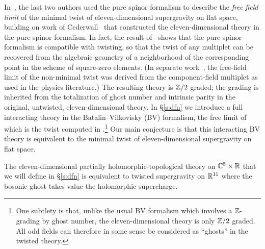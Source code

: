 In~\cite{SWspinor}, the last two authors used the pure spinor formalism to describe the {\em free field limit} of the minimal twist of eleven-dimensional supergravity on flat space, building on work of Cederwall~\cite{Ced-towards,Ced-11d} that constructed the eleven-dimensional theory in the pure spinor formalism. In fact, the result of~\cite{SWspinor} shows that the pure spinor formalism is compatible with twisting, so that the twist of any multiplet can be recovered from the algebraic geometry of a neighborhood of the corresponding point in the scheme of square-zero elements.
(In separate work~\cite{EagerHahner}, the free-field limit of the non-minimal twist was derived from the component-field multiplet as used in the physics literature.)
The resulting theory is $\mathbb Z/2$ graded; the grading is inherited from the totalization of ghost number and intrinsic parity in the original, untwisted, eleven-dimensional theory.
In \S\ref{s:dfn} we introduce a full interacting theory in the Batalin--Vilkovisky (BV) formalism, the free limit of which is the twist computed in \cite{SWspinor}.\footnote{One subtlety is that, unlike the usual BV formalism which involves a $\mathbb Z$-grading by ghost number, the eleven-dimensional theory is only $\mathbb Z/2$ graded.
All odd fields can therefore in some sense be considered as ``ghosts'' in the twisted theory.}
Our main conjecture is that this interacting BV theory is equivalent to the minimal twist of eleven-dimensional supergravity on flat space.

\begin{conj}
The eleven-dimensional partially holomorphic-topological theory on $\mathbb C^5 \times \mathbb R$ that we will define in \S \ref{s:dfn} is equivalent to twisted supergravity on $\mathbb R^{11}$ where the bosonic ghost takes value the holomorphic supercharge. 
\end{conj}


